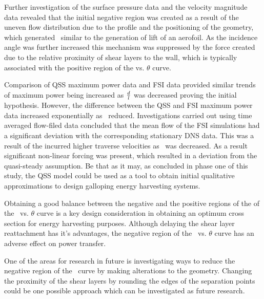 Further investigation of the surface pressure data and the velocity magnitude data revealed that the initial negative region was created as a result of the uneven flow distribution due to the profile and the positioning of the geometry, which generated \cy\ similar to the generation of lift of an aerofoil. As the incidence angle was further increased this mechanism was suppressed by the force created due to the relative proximity of shear layers to the wall, which is typically associated with the positive region of the \cy vs. $\theta$ curve. 

Comparison of QSS maximum power data and FSI data provided similar trends of maximum power being increased as $\frac{d}{l}$ was decreased proving the initial hypothesis. However, the difference between the QSS and FSI maximum power data increased exponentially as \ratio\ reduced. Investigations carried out using time averaged flow-filed data concluded that the mean flow of the FSI simulations had a significant deviation with the corresponding stationary DNS data. This was a result of the incurred higher  traverse velocities as \ratio\ was decreased. As a result significant non-linear forcing was present, which resulted in a deviation from the quasi-steady assumption. Be that as it may, as concluded in phase one of this study, the QSS model could be used as a tool to obtain initial qualitative approximations to design galloping energy harvesting systems. 

Obtaining a good balance between the negative and the positive regions of the of the \cy\ vs. $\theta$ curve is a key design consideration in obtaining an optimum cross section for energy harvesting purposes. Although delaying the shear layer reattachment has it's advantages, the negative region of the \cy\ vs. $\theta$ curve has an adverse effect on power transfer. 

One of the areas for research in future is investigating ways to reduce the negative region of the \cy\ curve by making alterations to the geometry. Changing the proximity of the shear layers by rounding the edges of the separation points could be one possible approach which can be investigated as future research. 







  

